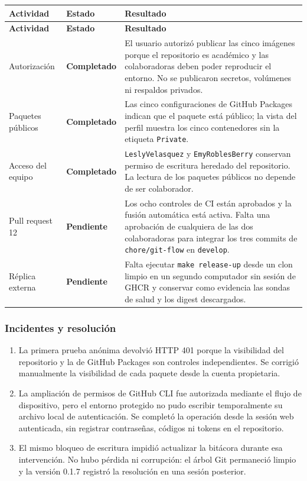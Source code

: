\documentclass[11pt,letterpaper]{article}
\newcommand{\statusok}{\textcolor{deepgreen}{\textbf{Completado}}}
\newcommand{\statuspending}{\textcolor{warning}{\textbf{Pendiente}}}
\newcommand{\file}[1]{\texttt{#1}}
\begin{document}
\begin{longtable}{@{}p{}p{}p{}@{}}
  \toprule
  \textbf{Actividad} & \textbf{Estado} & \textbf{Resultado} \\
  \midrule
  \endfirsthead
  \toprule
  \textbf{Actividad} & \textbf{Estado} & \textbf{Resultado} \\
  \midrule
  \endhead
  Autorización & \statusok & El usuario autorizó publicar las cinco imágenes porque el repositorio es académico y las colaboradoras deben poder reproducir el entorno. No se publicaron secretos, volúmenes ni respaldos privados. \\
  Paquetes públicos & \statusok & Las cinco configuraciones de GitHub Packages indican que el paquete está público; la vista del perfil muestra los cinco contenedores sin la etiqueta \file{Private}. \\
  Acceso del equipo & \statusok & \file{LeslyVelasquez} y \file{EmyRoblesBerry} conservan permiso de escritura heredado del repositorio. La lectura de los paquetes públicos no depende de ser colaborador. \\
  Pull request 12 & \statuspending & Los ocho controles de CI están aprobados y la fusión automática está activa. Falta una aprobación de cualquiera de las dos colaboradoras para integrar los tres commits de \file{chore/git-flow} en \file{develop}. \\
  Réplica externa & \statuspending & Falta ejecutar \file{make release-up} desde un clon limpio en un segundo computador sin sesión de GHCR y conservar como evidencia las sondas de salud y los digest descargados. \\
  \bottomrule
\end{longtable}

\subsubsection{Incidentes y resolución}

\begin{enumerate}
  \item La primera prueba anónima devolvió HTTP 401 porque la visibilidad del repositorio y la de GitHub Packages son controles independientes. Se corrigió manualmente la visibilidad de cada paquete desde la cuenta propietaria.
  \item La ampliación de permisos de GitHub CLI fue autorizada mediante el flujo de dispositivo, pero el entorno protegido no pudo escribir temporalmente su archivo local de autenticación. Se completó la operación desde la sesión web autenticada, sin registrar contraseñas, códigos ni tokens en el repositorio.
  \item El mismo bloqueo de escritura impidió actualizar la bitácora durante esa intervención. No hubo pérdida ni corrupción: el árbol Git permaneció limpio y la versión 0.1.7 registró la resolución en una sesión posterior.
\end{enumerate}
\end{document}
